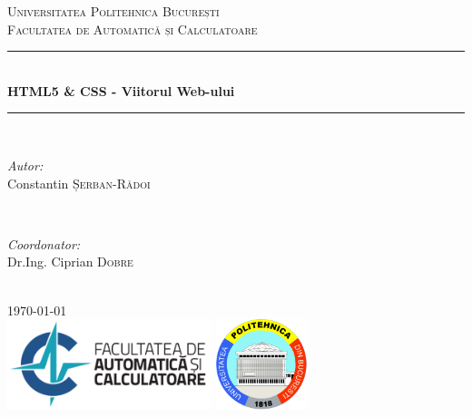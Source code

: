 \documentclass[12pt]{article} %
\begin{document}

\begin{titlepage}

\newcommand{\HRule}{\rule{\linewidth}{0.5mm}} %

\center %

\textsc{\LARGE Universitatea Politehnica București}\\[1.5cm] %
\textsc{\Large Facultatea de Automatică și Calculatoare}\\[0.5cm] %

\HRule \\[0.4cm]
{ \huge \bfseries HTML5 \& CSS - Viitorul Web-ului}\\[0.4cm] %
\HRule \\[1.5cm]

\begin{minipage}{0.4\textwidth}
\begin{flushleft} \large
\emph{Autor:}\\
Constantin \textsc{Șerban-Rădoi} %
\end{flushleft}
\end{minipage}
~
\begin{minipage}{0.4\textwidth}
\begin{flushright} \large
\emph{Coordonator:} \\
Dr.Ing. Ciprian \textsc{Dobre} %
\end{flushright}
\end{minipage}\\[4cm]

{\large \today}\\[3cm] %

\includegraphics[height=100px]{logo-acs-text} %
\includegraphics[height=100px]{logo-upb}

\vfill %

\end{titlepage}
\end{document}
